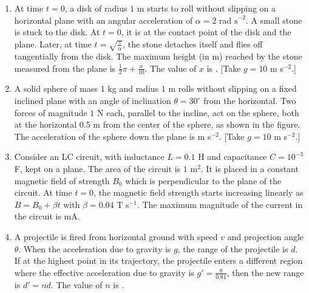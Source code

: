 \documentclass{article}
\begin{document}
\begin{enumerate}
    \item At time $t = 0$, a disk of radius $1$ m starts to roll without slipping on a horizontal plane with an angular acceleration of $\alpha = 2 \text{ rad s}^{-2}$. A small stone is stuck to the disk. At $t = 0$, it is at the contact point of the disk and the plane. Later, at time $t = \sqrt{\frac{\pi}{\alpha}}$, the stone detaches itself and flies off tangentially from the disk. The maximum height (in m) reached by the stone measured from the plane is $\frac{1}{2} \pi + \frac{x}{10}$. The value of $x$ is \underline{\hspace{3cm}}. [Take $g = 10$ m s$^{-2}$.]

    \item A solid sphere of mass $1$ kg and radius $1$ m rolls without slipping on a fixed inclined plane with an angle of inclination $\theta = 30^\circ$ from the horizontal. Two forces of magnitude $1$ N each, parallel to the incline, act on the sphere, both at the horizontal 0.5 m from the center of the sphere, as shown in the figure. The acceleration of the sphere down the plane is \underline{\hspace{3cm}} m s$^{-2}$. [Take $g = 10$ m s$^{-2}$.]
    
    \begin{center}
    \end{center}
	
    \item Consider an LC circuit, with inductance $L = 0.1$ H and capacitance $C = 10^{-3}$F, kept on a plane. The area of the circuit is $1$ m$^2$. It is placed in a constant magnetic field of strength $B_0$ which is perpendicular to the plane of the circuit. At time $t = 0$, the magnetic field strength starts increasing linearly as $B = B_0 + \beta t$ with $\beta = 0.04$ T s$^{-1}$. The maximum magnitude of the current in the circuit is \underline{\hspace{3cm}} mA.

    \item A projectile is fired from horizontal ground with speed $v$ and projection angle $\theta$. When the acceleration due to gravity is $g$, the range of the projectile is $d$. If at the highest point in its trajectory, the projectile enters a different region where the effective acceleration due to gravity is $g' = \frac{g}{0.81}$, then the new range is $d' = n d$. The value of $n$ is \underline{\hspace{3cm}}.


\end{enumerate}
\end{document}
